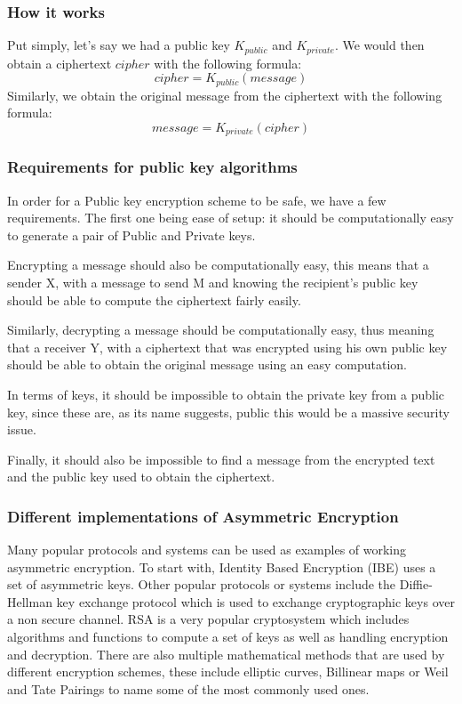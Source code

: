\documentclass[conference]{IEEEtran}
\begin{document}
\subsubsection{How it works}
Put simply, let's say we had a public key $K_{public}$ and $K_{private}$.
We would then obtain a ciphertext $cipher$ with the following formula: 
\begin{equation*}
    cipher = K_{public}(message)
\end{equation*}
Similarly, we obtain the original message from the ciphertext with the following formula:
\begin{equation*}
    message = K_{private}(cipher)
\end{equation*}


\subsubsection{Requirements for public key algorithms}
In order for a Public key encryption scheme to be safe, we have a few requirements.
The first one being ease of setup: it should be computationally easy to generate
a pair of Public and Private keys.

Encrypting a message should also be computationally easy, this means that a 
sender X, with a message to send M and knowing the recipient's public key 
should be able to compute the ciphertext fairly easily.

Similarly, decrypting a message should be computationally easy, thus meaning that
a receiver Y, with a ciphertext that was encrypted using his own public key 
should be able to obtain the original message using an easy computation.

In terms of keys, it should be impossible to obtain the private key from a 
public key, since these are, as its name suggests, public this would be a 
massive security issue.

Finally, it should also be impossible to find a message from the encrypted text and 
the public key used to obtain the ciphertext.


\subsubsection{Different implementations of Asymmetric Encryption}
Many popular protocols and systems can be used as examples of working 
asymmetric encryption. To start with, Identity Based Encryption (IBE)
uses a set of asymmetric keys. Other popular protocols or systems include
the Diffie-Hellman key exchange protocol which is used to exchange cryptographic 
keys over a non secure channel. RSA is a very popular cryptosystem which includes
algorithms and functions to compute a set of keys as well as handling encryption and decryption.
There are also multiple mathematical methods that are used by different encryption schemes,
these include  elliptic curves, Billinear maps or Weil and Tate Pairings to name
some of the most commonly used ones.
\end{document}
